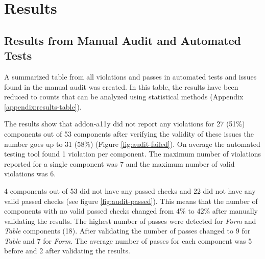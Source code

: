 \documentclass{master_thesis}
\begin{document}
\section{Results} \label{chap:results}

\subsection{Results from Manual Audit and Automated Tests}


A summarized table from all violations and passes in automated tests and issues found in the manual audit was created. In this table, the results have been reduced to counts that can be analyzed using statistical methods (Appendix \ref{appendix:results-table}).

The results show that addon-a11y did not report any violations for 27 (51\%) components out of 53 components after verifying the validity of these issues the number goes up to 31 (58\%) (Figure \ref{fig:audit-failed}). On average the automated testing tool found 1 violation per component. The maximum number of violations reported for a single component was 7 and the maximum number of valid violations was 6.

4 components out of 53 did not have any passed checks and 22 did not have any valid passed checks (see figure \ref{fig:audit-passed}). This means that the number of components with no valid passed checks changed from 4\%  to 42\% after manually validating the results. The highest number of passes were detected for \textit{Form} and \textit{Table} components (18). After validating the number of passes changed to 9 for \textit{Table} and 7 for \textit{Form}. The average number of passes for each component was 5 before and 2 after validating the results.
\end{document}
